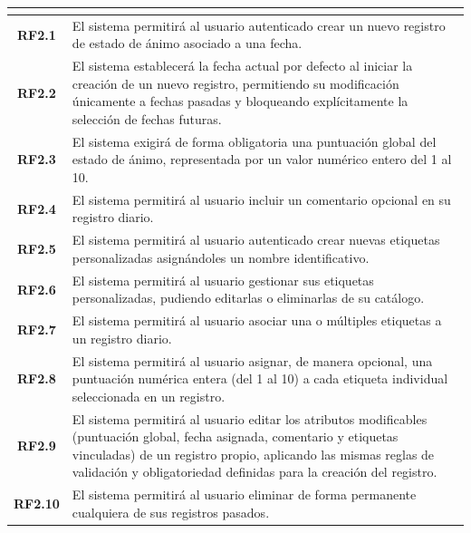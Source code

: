 \begin{xltabular}{\textwidth}{|>{\bfseries}c|X|}
     \\ \hline
    RF2.1 & El sistema permitirá al usuario autenticado crear un nuevo registro de estado de ánimo asociado a una fecha. \\ \hline
    RF2.2 & El sistema establecerá la fecha actual por defecto al iniciar la creación de un nuevo registro, permitiendo su modificación únicamente a fechas pasadas y bloqueando explícitamente la selección de fechas futuras. \\ \hline
    RF2.3 & El sistema exigirá de forma obligatoria una puntuación global del estado de ánimo, representada por un valor numérico entero del 1 al 10. \\ \hline
    RF2.4 & El sistema permitirá al usuario incluir un comentario opcional en su registro diario. \\ \hline
    RF2.5 & El sistema permitirá al usuario autenticado crear nuevas etiquetas personalizadas asignándoles un nombre identificativo. \\ \hline
    RF2.6 & El sistema permitirá al usuario gestionar sus etiquetas personalizadas, pudiendo editarlas o eliminarlas de su catálogo. \\ \hline
    RF2.7 & El sistema permitirá al usuario asociar una o múltiples etiquetas a un registro diario. \\ \hline
    RF2.8 & El sistema permitirá al usuario asignar, de manera opcional, una puntuación numérica entera (del 1 al 10) a cada etiqueta individual seleccionada en un registro. \\ \hline
    RF2.9 & El sistema permitirá al usuario editar los atributos modificables (puntuación global, fecha asignada, comentario y etiquetas vinculadas) de un registro propio, aplicando las mismas reglas de validación y obligatoriedad definidas para la creación del registro. \\ \hline
    RF2.10 & El sistema permitirá al usuario eliminar de forma permanente cualquiera de sus registros pasados. \\ \hline


\end{xltabular}
